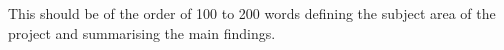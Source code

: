 This should be of the order of 100 to 200 words defining the subject area of the project and summarising the main findings.

